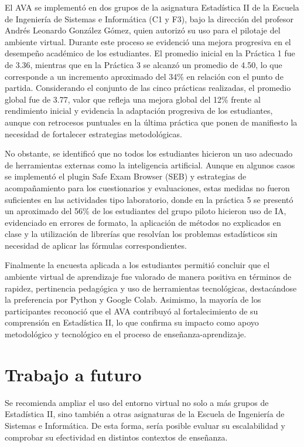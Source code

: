 \documentclass[letter,oneside,12pt,spanish]{report}
\begin{document}
El AVA se implementó en dos grupos de la asignatura Estadística II de la Escuela de Ingeniería de Sistemas e Informática (C1 y F3), bajo la dirección del profesor Andrés Leonardo González Gómez, quien autorizó su uso para el pilotaje del ambiente virtual. Durante este proceso se evidenció una mejora progresiva en el desempeño académico de los estudiantes. El promedio inicial en la Práctica 1 fue de 3.36, mientras que en la Práctica 3 se alcanzó un promedio de 4.50, lo que corresponde a un incremento aproximado del 34\% en relación con el punto de partida. Considerando el conjunto de las cinco prácticas realizadas, el promedio global fue de 3.77, valor que refleja una mejora global del 12\% frente al rendimiento inicial y evidencia la adaptación progresiva de los estudiantes, aunque con retrocesos puntuales en la última práctica que ponen de manifiesto la necesidad de fortalecer estrategias metodológicas.

No obstante, se identificó que no todos los estudiantes hicieron un uso adecuado de herramientas externas como la inteligencia artificial. Aunque en algunos casos se implementó el plugin Safe Exam Browser (SEB) y estrategias de acompañamiento para los cuestionarios y evaluaciones, estas medidas no fueron suficientes en las actividades tipo laboratorio, donde en la práctica 5 se presentó un aproximado del 56\% de los estudiantes del grupo piloto hicieron uso de IA, evidenciado en errores de formato, la aplicación de métodos no explicados en clase y la utilización de librerías que resolvían los problemas estadísticos sin necesidad de aplicar las fórmulas correspondientes.

Finalmente la encuesta aplicada a los estudiantes permitió concluir que el ambiente virtual de aprendizaje fue valorado de manera positiva en términos de rapidez, pertinencia pedagógica y uso de herramientas tecnológicas, destacándose la preferencia por Python y Google Colab. Asimismo, la mayoría de los participantes reconoció que el AVA contribuyó al fortalecimiento de su comprensión en Estadística II, lo que confirma su impacto como apoyo metodológico y tecnológico en el proceso de enseñanza-aprendizaje.

\section{Trabajo a futuro}

Se recomienda ampliar el uso del entorno virtual no solo a más grupos de Estadística II, sino también a otras asignaturas de la Escuela de Ingeniería de Sistemas e Informática. De esta forma, sería posible evaluar su escalabilidad y comprobar su efectividad en distintos contextos de enseñanza.
\end{document}
